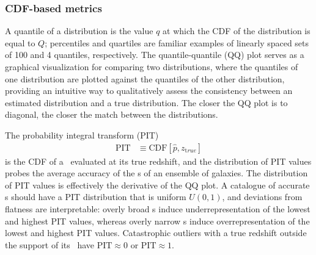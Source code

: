 \subsubsection{CDF-based metrics}
\label{sec:qqpit}

A quantile of a distribution is the value $q$ at which the CDF of the distribution is equal to $Q$; percentiles and quartiles are familiar examples of linearly spaced sets of 100 and 4 quantiles, respectively.
The quantile-quantile (QQ) plot serves as a graphical visualization for comparing two distributions, where the quantiles of one distribution are plotted against the quantiles of the other distribution, providing an intuitive way to qualitatively assess the consistency between an estimated distribution and a true distribution.
The closer the QQ plot is to diagonal, the closer the match between the distributions.

The probability integral transform (PIT)
\begin{align}
\label{eq:pit}
\mathrm{PIT} &\equiv \mathrm{CDF}[\hat{p}, z_{\mathrm true}]
\end{align}
is the CDF of a \pzpdf\ evaluated at its true redshift, and the distribution of PIT values probes the average accuracy of the \pzpdf s of an ensemble of galaxies.
The distribution of PIT values is effectively the derivative of the QQ plot.
A catalogue of accurate \pzpdf s should have a PIT distribution that is uniform $U(0,1)$, and deviations from flatness are interpretable: overly broad \pzpdf s induce underrepresentation of the lowest and highest PIT values, whereas overly narrow \pzpdf s induce overrepresentation of the lowest and highest PIT values.
Catastrophic outliers with a true redshift outside the support of its \pzpdf\ have $\mathrm{PIT} \approx 0$ or $\mathrm{PIT} \approx 1$.

